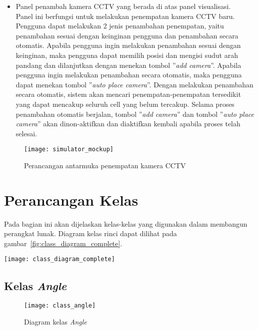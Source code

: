 \begin{itemize}
\begin{itemize}
		\item Panel penambah kamera CCTV yang berada di atas panel visualisasi.\\
		Panel ini berfungsi untuk melakukan penempatan kamera CCTV baru. Pengguna dapat melakukan 2 jenis penambahan penempatan, yaitu penambahan sesuai dengan keinginan pengguna dan penambahan secara otomatis. Apabila pengguna ingin melakukan penambahan sesuai dengan keinginan, maka pengguna dapat memilih posisi dan mengisi sudut arah pandang dan dilanjutkan dengan menekan tombol ''\textit{add camera}''. Apabila pengguna ingin melakukan penambahan secara otomatis, maka pengguna dapat menekan tombol ''\textit{auto place camera}''. Dengan melakukan penambahan secara otomatis, sistem akan mencari penempatan-penempatan tersedikit yang dapat mencakup seluruh cell yang belum tercakup. Selama proses penambahan otomatis berjalan, tombol ''\textit{add camera}'' dan tombol ''\textit{auto place camera}'' akan dinon-aktifkan dan diaktifkan kembali apabila proses telah selesai.
	\end{itemize}
	\begin{figure}[h]
		\centering  
		\texttt{[image: simulator\_mockup]}
		\caption[Perancangan antarmuka penempatan kamera CCTV]{Perancangan antarmuka penempatan kamera CCTV}
		\label{fig:simulator_mockup}
	\end{figure}
\end{itemize}

\section{Perancangan Kelas}
Pada bagian ini akan dijelaskan kelas-kelas yang digunakan dalam membangun perangkat lunak. Diagram kelas rinci dapat dilihat pada gambar~\ref{fig:class_diagram_complete}.
\begin{sidewaysfigure}
	\centering  
	\texttt{[image: class\_diagram\_complete]}
	\caption[Diagram kelas rinci]{Diagram kelas rinci}
	\label{fig:class_diagram_complete}
\end{sidewaysfigure}

\subsection{Kelas \textit{Angle}}
\begin{figure}[H]
	\centering  
	\texttt{[image: class\_angle]}
	\caption[Diagram kelas \textit{Angle}]{Diagram kelas \textit{Angle}}
	\label{fig:class_angle}
\end{figure}
	
